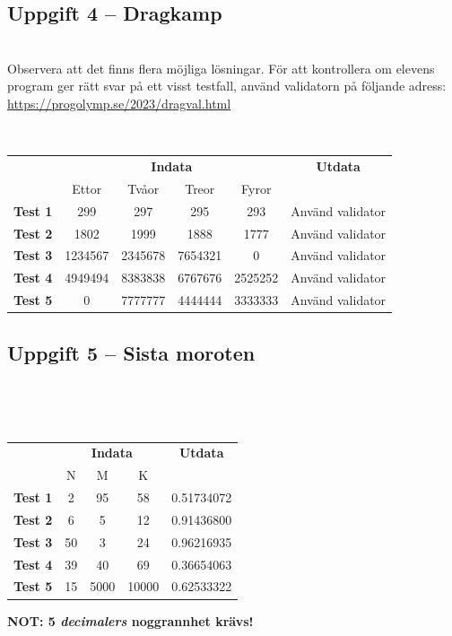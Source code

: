 \documentclass[a4paper,12pt,oneside]{amsbook}
\theoremstyle{test}
\newcommand{\fe}[1]{\textbf{#1}}            %
\begin{document}
\subsection*{Uppgift 4 -- Dragkamp}
~\\
Observera att det finns flera möjliga lösningar. För att kontrollera om elevens program ger rätt svar på ett visst testfall, använd validatorn på följande adress:\\
\url{https://progolymp.se/2023/dragval.html}\\
{\tt 
\begin{tabular}{||l||c|c|c|c||c||}\hline\hline
& \multicolumn{4}{c||}{\fe{Indata}} & \fe{Utdata} \\ 
& Ettor & Tvåor & Treor & Fyror & \\ \hline \hline
\fe{Test 1} & 299 &297 &295 &293&Använd validator\\ \hline
\fe{Test 2} & 1802 &1999 &1888 &1777&Använd validator\\ \hline
\fe{Test 3} & 1234567 &2345678 &7654321 &0&Använd validator\\ \hline
\fe{Test 4} & 4949494 &8383838 &6767676 &2525252&Använd validator\\ \hline
\fe{Test 5} & 0 &7777777 &4444444 &3333333&Använd validator\\ \hline\hline
\end{tabular}
}
\vspace{1cm}




\subsection*{Uppgift 5 -- Sista moroten}

~\\
{\tt 
\begin{tabular}{||l||c|c|c||c||}\hline\hline
& \multicolumn{3}{c||}{\fe{Indata}} & \fe{Utdata} \\ 
& N & M & K & \\ \hline \hline
\fe{Test 1} & 2 &95 &58 &0.51734072\\ \hline
\fe{Test 2} & 6 &5 &12 &0.91436800\\ \hline
\fe{Test 3} & 50 &3 &24 &0.96216935\\ \hline
\fe{Test 4} & 39 &40 &69 &0.36654063\\ \hline
\fe{Test 5} & 15 &5000 &10000 &0.62533322\\ \hline\hline
\end{tabular}
}


\textbf{NOT: 5 \emph{decimalers} noggrannhet krävs!}
\end{document}
